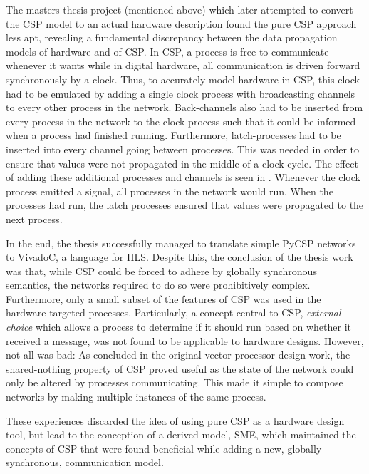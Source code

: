 The masters thesis project (mentioned above) which later attempted to convert
the CSP model to an actual hardware description found the pure CSP approach less
apt, revealing a fundamental discrepancy between the data propagation models of
hardware and of CSP. In CSP, a process is free to communicate whenever it wants
while in digital hardware, all communication is driven forward synchronously by
a clock.
Thus, to accurately model hardware in CSP, this clock had to be emulated by
adding a single clock process with broadcasting channels to every other process
in the network. Back-channels also had to be inserted from every process in the
network to the clock process such that it could be informed when a process had
finished running. Furthermore, latch-processes had to be inserted into every
channel going between processes. This was needed in order to ensure that values
were not propagated in the middle of a clock cycle. The effect of adding these
additional processes and channels is seen in . Whenever the
clock process emitted a signal, all processes in the network would run. When the
processes had run, the latch processes ensured that values were propagated to
the next process.

In the end, the thesis successfully managed to translate simple PyCSP networks
to VivadoC, a language for HLS. Despite this, the conclusion of the thesis work
was that, while CSP could be forced to adhere by globally synchronous semantics,
the networks required to do so were prohibitively complex. Furthermore, only a
small subset of the features of CSP was used in the hardware-targeted
processes. Particularly, a concept central to CSP, \textit{external choice}
which allows a process to determine if it should run based on whether it
received a message, was not found to be applicable to hardware designs. However,
not all was bad: As concluded in the original vector-processor design work, the
shared-nothing property of CSP proved useful as the state of the network could
only be altered by processes communicating. This made it simple to compose
networks by making multiple instances of the same process.

These experiences discarded the idea of using pure CSP as a hardware design
tool, but lead to the conception of a derived model, SME, which maintained the
concepts of CSP that were found beneficial while adding a new, globally
synchronous, communication model. \cite{vinter2014synchronous}

